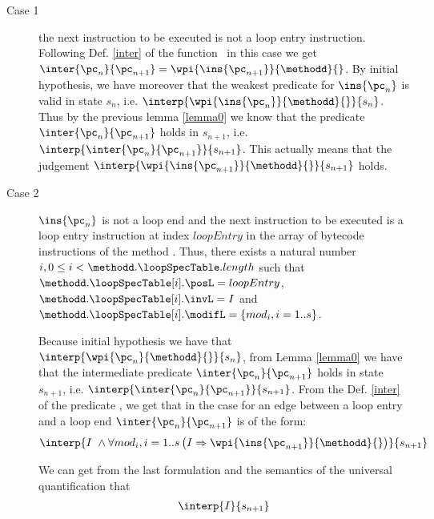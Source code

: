   
\begin{description}
  \item [Case 1] the next instruction to be executed is not a loop entry instruction. 
           	Following Def. \ref{inter} of the function \interOnly \ in this case 
              we get $ \inter{\pc_n}{\pc_{n+1}} = \wpi{ \ins{\pc_{n+1} }}{\methodd}{}$. By initial hypothesis,
	       we have moreover that the weakest predicate for $\ins{\pc_{n}}$ is valid in 
	       state $s_n$, i.e.  $ \interp{\wpi{\ins{\pc_{n}} }{ \methodd }{} }{ s_n }$.
	      Thus by the previous lemma \ref{lemma0}  we know that 
	      the predicate $\inter{\pc_n}{\pc_{n+1}}$ holds in $s_{n+1}$, i.e. $\interp{\inter{\pc_n}{\pc_{n+1}} }{ s_{n+1} }$.
	      This actually means that the judgement 
	      $\interp{ \wpi{\ins{\pc_{n+1}}}{\methodd}{} }{ s_{n+1} }$	      holds.

 
  
\item [Case 2]
 $\ins{\pc_n} $ is not a loop end and the next instruction to be executed is a loop entry 
instruction at index $loopEntry $ in the array of bytecode instructions of the method \methodd{}.
 Thus, there exists a natural number  $ i , 0 \le i < \methodd.\loopSpecTable.length   $   such that
 $ \methodd. \loopSpecTable[i].\posL = loopEntry $,  $ \methodd. \loopSpecTable[i].\invL = I $ and
   $ \methodd. \loopSpecTable[i].\modifL =\{ mod_i, i = 1..s \}$.




Because initial hypothesis we have that  $\interp{\wpi{\pc_n}{\methodd}{}}{s_n} $, from Lemma \ref{lemma0} we have
that  the intermediate predicate $\inter{\pc_n}{\pc_{n+1}}$ holds in state $s_{n+1}$, i.e. 
 $\interp{\inter{\pc_n}{\pc_{n+1}} }{s_{n+1}} $. 
From the  Def. \ref{inter} of the predicate \interOnly{}, we get that   
in the case for  an edge between a loop entry and a loop end $\inter{\pc_n}{\pc_{n+1}}$ is of the form:
     \begin{equation*}
                 \interp{  I \  \wedge
                                             \forall mod_i ,  i = 1..s \left( I \Rightarrow \wpi{\ins{\pc_{n+1}}}{\methodd}{} \right) 
                                 }  { s_{n+1}  }
\end{equation*}
  
We can get from the last formulation and the semantics of the universal quantification  that 
 \begin{equation*} 
\begin{array}{l}
                  \interp{I}   {s_{n+1} } \\
                              

\end{array}
\end{equation*}
\end{description}
